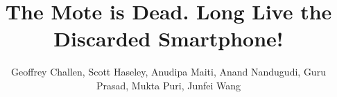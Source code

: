 

\title{The Mote is Dead. Long Live the Discarded Smartphone!}


\author{
\alignauthor
Geoffrey Challen, Scott Haseley, Anudipa Maiti, Anand Nandugudi, Guru Prasad,
Mukta Puri, Junfei Wang\\
\\
\\
}

\crdata{}

\maketitle










{\footnotesize
\renewcommand{\baselinestretch}{0.9}


}


